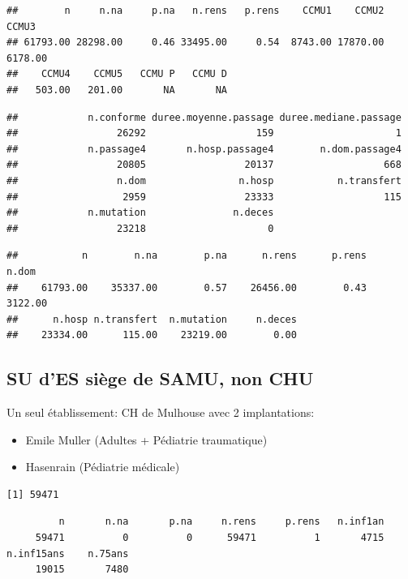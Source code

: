 \documentclass[]{article}
\begin{document}
\begin{verbatim}
##        n     n.na     p.na   n.rens   p.rens    CCMU1    CCMU2    CCMU3 
## 61793.00 28298.00     0.46 33495.00     0.54  8743.00 17870.00  6178.00 
##    CCMU4    CCMU5   CCMU P   CCMU D 
##   503.00   201.00       NA       NA
\end{verbatim}

\begin{verbatim}
##            n.conforme duree.moyenne.passage duree.mediane.passage 
##                 26292                   159                     1 
##            n.passage4       n.hosp.passage4        n.dom.passage4 
##                 20805                 20137                   668 
##                 n.dom                n.hosp           n.transfert 
##                  2959                 23333                   115 
##            n.mutation               n.deces 
##                 23218                     0
\end{verbatim}

\begin{verbatim}
##           n        n.na        p.na      n.rens      p.rens       n.dom 
##    61793.00    35337.00        0.57    26456.00        0.43     3122.00 
##      n.hosp n.transfert  n.mutation     n.deces 
##    23334.00      115.00    23219.00        0.00
\end{verbatim}

\subsection{SU d'ES siège de SAMU, non
CHU}\label{su-des-siege-de-samu-non-chu}

Un seul établissement: CH de Mulhouse avec 2 implantations:

\begin{itemize}
\itemsep1pt\parskip0pt
\item
  Emile Muller (Adultes + Pédiatrie traumatique)
\item
  Hasenrain (Pédiatrie médicale)
\end{itemize}

\begin{verbatim}
[1] 59471
\end{verbatim}

\begin{verbatim}
         n       n.na       p.na     n.rens     p.rens   n.inf1an 
     59471          0          0      59471          1       4715 
n.inf15ans    n.75ans 
     19015       7480 
\end{verbatim}
\end{document}
